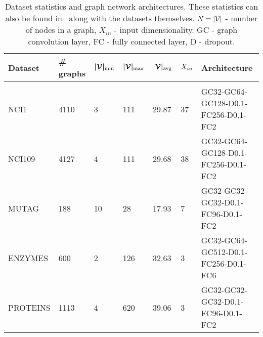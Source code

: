 \documentclass[final,nonatbib]{article} \usepackage{nips_2018}
\begin{document}
	\begin{table}[htp]
		\caption{Dataset statistics and graph network architectures.
		These statistics can also be found in~\cite{KKMMN2016} along with the datasets themselves. $N=|{\cal V}|$ - number of nodes in a graph, $X_{in}$ - input dimensionality. GC - graph convolution layer, FC - fully connected layer, D - dropout.}
		\label{table:networks}
		\small
		\centering
		\setlength{\tabcolsep}{5pt}
		\begin{tabular}{lllllll}
			\textbf{Dataset}  & \textbf{\# graphs} & $\boldmath{|{\cal V}|_{\text{min}}}$ & $\boldmath{|{\cal V}|_{\text{max}}}$ & $\boldmath{|{\cal V}|_{\text{avg}}}$ & $\boldmath{X_{in}}$ & \textbf{Architecture} \\
			\hline \\
			NCI1 & 4110 & 3 & 111 & 29.87 & 37 & GC32-GC64-GC128-D0.1-FC256-D0.1-FC2 \\
			NCI109 & 4127 & 4 & 111 & 29.68 & 38 & GC32-GC64-GC128-D0.1-FC256-D0.1-FC2 \\
			MUTAG & 188 & 10 & 28 & 17.93 & 7 & GC32-GC32-GC32-D0.1-FC96-D0.1-FC2 \\
			ENZYMES & 600 & 2 & 126 & 32.63 & 3 & GC32-GC64-GC512-D0.1-FC256-D0.1-FC6 \\
			PROTEINS & 1113 & 4 & 620 & 39.06 & 3 & GC32-GC32-GC32-D0.1-FC96-D0.1-FC2 \\
		\end{tabular}
	\end{table}

	\vfill
\end{document}
